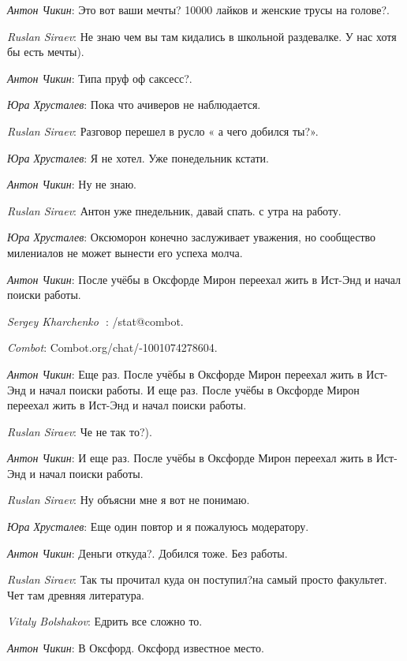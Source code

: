 \documentclass[10pt]{book}
\newcommand{\AUTHOR}[1]{\emph{#1}:}
\begin{document}
\AUTHOR{Антон Чикин} Это вот ваши мечты? 10000 лайков и женские трусы на голове?.

\AUTHOR{Ruslan Siraev} Не знаю чем вы там кидались в школьной раздевалке. У нас хотя бы есть мечты).

\AUTHOR{Антон Чикин} Типа пруф оф саксесс?.

\AUTHOR{Юра Хрусталев} Пока что ачиверов не наблюдается.

\AUTHOR{Ruslan Siraev} Разговор перешел в русло « а чего добился ты?».

\AUTHOR{Юра Хрусталев} Я не хотел. Уже понедельник кстати.

\AUTHOR{Антон Чикин} Ну не знаю.

\AUTHOR{Ruslan Siraev} Антон уже пнедельник, давай спать. с утра на работу.

\AUTHOR{Юра Хрусталев} Оксюморон конечно заслуживает уважения, но сообщество милениалов не может вынести его успеха молча.

\AUTHOR{Антон Чикин} После учёбы в Оксфорде Мирон переехал жить в Ист-Энд и начал поиски работы.

\AUTHOR{Sergey Kharchenko 🦁} /stat@combot.

\AUTHOR{Combot} Combot.org/chat/-1001074278604.

\AUTHOR{Антон Чикин} Еще раз. После учёбы в Оксфорде Мирон переехал жить в Ист-Энд и начал поиски работы. И еще раз. После учёбы в Оксфорде Мирон переехал жить в Ист-Энд и начал поиски работы.

\AUTHOR{Ruslan Siraev} Че не так то?).

\AUTHOR{Антон Чикин} И еще раз. После учёбы в Оксфорде Мирон переехал жить в Ист-Энд и начал поиски работы.

\AUTHOR{Ruslan Siraev} Ну объясни мне я вот не понимаю.

\AUTHOR{Юра Хрусталев} Еще один повтор и я пожалуюсь модератору.

\AUTHOR{Антон Чикин} Деньги откуда?. Добился тоже. Без работы.

\AUTHOR{Ruslan Siraev} Так ты прочитал куда он поступил?на самый просто факультет. Чет там древняя литература.

\AUTHOR{Vitaly Bolshakov} Едрить все сложно то.

\AUTHOR{Антон Чикин} В Оксфорд. Оксфорд известное место.
\end{document}
